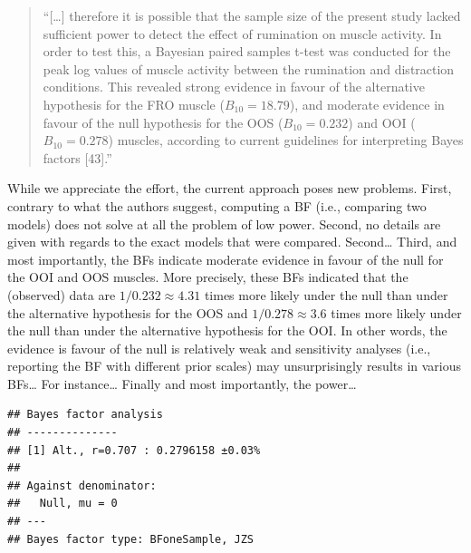 \documentclass[
  english,
  man,floatsintext]{apa6}
\newenvironment{Shaded}{\begin{snugshade}}{\end{snugshade}}
\newcommand{\DataTypeTok}[1]{\textcolor[rgb]{0.13,0.29,0.53}{#1}}
\newcommand{\KeywordTok}[1]{\textcolor[rgb]{0.13,0.29,0.53}{\textbf{#1}}}
\newcommand{\NormalTok}[1]{#1}
\newcommand{\OperatorTok}[1]{\textcolor[rgb]{0.81,0.36,0.00}{\textbf{#1}}}
\newcommand{\OtherTok}[1]{\textcolor[rgb]{0.56,0.35,0.01}{#1}}
\newcommand{\StringTok}[1]{\textcolor[rgb]{0.31,0.60,0.02}{#1}}
\begin{document}
\begin{quote}
``{[}\ldots{]} therefore it is possible that the sample size of the present study lacked sufficient power to detect the effect of rumination on muscle activity. In order to test this, a Bayesian paired samples t-test was conducted for the peak log values of muscle activity between the rumination and distraction conditions. This revealed strong evidence in favour of the alternative hypothesis for the FRO muscle (\(B_{10} = 18.79\)), and moderate evidence in favour of the null hypothesis for the OOS (\(B_{10} = 0.232\)) and OOI (\(B_{10} = 0.278\)) muscles, according to current guidelines for interpreting Bayes factors {[}43{]}.''
\end{quote}

While we appreciate the effort, the current approach poses new problems. First, contrary to what the authors suggest, computing a BF (i.e., comparing two models) does not solve at all the problem of low power. Second, no details are given with regards to the exact models that were compared. Second\ldots{} Third, and most importantly, the BFs indicate moderate evidence in favour of the null for the OOI and OOS muscles. More precisely, these BFs indicated that the (observed) data are \(1 / 0.232 \approx 4.31\) times more likely under the null than under the alternative hypothesis for the OOS and \(1 / 0.278 \approx 3.6\) times more likely under the null than under the alternative hypothesis for the OOI. In other words, the evidence is favour of the null is relatively weak and sensitivity analyses (i.e., reporting the BF with different prior scales) may unsurprisingly results in various BFs\ldots{} For instance\ldots{} Finally and most importantly, the power\ldots{}

\begin{Shaded}
\end{Shaded}

\begin{verbatim}
## Bayes factor analysis
## --------------
## [1] Alt., r=0.707 : 0.2796158 ±0.03%
## 
## Against denominator:
##   Null, mu = 0 
## ---
## Bayes factor type: BFoneSample, JZS
\end{verbatim}
\end{document}

